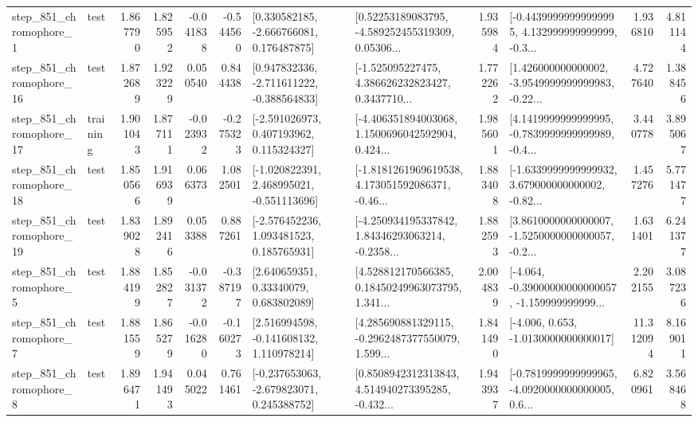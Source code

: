 \begin{tabular}{llrrrrllrlrr}
   step\_851\_chromophore\_1 &      test &      1.867790 &    1.825952 &     -0.041838 & -0.544560 &    [0.330582185, -2.666766081, 0.176487875] &  [0.52253189083795, -4.589252455319309, 0.05306... &       1.935984 &  [-0.44399999999999995, 4.132999999999999, -0.3... &            1.936810 &          4.811144 \\
  step\_851\_chromophore\_16 &      test &      1.872689 &    1.923229 &      0.050540 &  0.844438 &   [0.947832336, -2.711611222, -0.388564833] &  [-1.525095227475, 4.386626232823427, 0.3437710... &       1.772262 &  [1.426000000000002, -3.9549999999999983, -0.22... &            4.727640 &          1.388456 \\
  step\_851\_chromophore\_17 &  training &      1.901043 &    1.877111 &     -0.023932 & -0.275323 &    [-2.591026973, 0.407193962, 0.115324327] &  [-4.406351894003068, 1.1500696042592904, 0.424... &       1.985601 &  [4.1419999999999995, -0.7839999999999989, -0.4... &            3.440778 &          3.895067 \\
  step\_851\_chromophore\_18 &      test &      1.850566 &    1.916939 &      0.066373 &  1.082501 &   [-1.020822391, 2.468995021, -0.551113696] &  [-1.8181261969619538, 4.173051592086371, -0.46... &       1.883408 &  [-1.6339999999999932, 3.679000000000002, -0.82... &            1.457276 &          5.771477 \\
  step\_851\_chromophore\_19 &      test &      1.839028 &    1.892416 &      0.053388 &  0.887261 &    [-2.576452236, 1.093481523, 0.185765931] &  [-4.250934195337842, 1.84346293063214, -0.2358... &       1.882593 &  [3.8610000000000007, -1.5250000000000057, -0.2... &            1.631401 &          6.241377 \\
   step\_851\_chromophore\_5 &      test &      1.884199 &    1.852827 &     -0.031372 & -0.387197 &      [2.640659351, 0.33340079, 0.683802089] &  [4.528812170566385, 0.18450249963073795, 1.341... &       2.004839 &  [-4.064, -0.39000000000000057, -1.159999999999... &            2.202155 &          3.087236 \\
   step\_851\_chromophore\_7 &      test &      1.881559 &    1.865279 &     -0.016280 & -0.160273 &    [2.516994598, -0.141608132, 1.110978214] &  [4.285690881329115, -0.2962487377550079, 1.599... &       1.841490 &               [-4.006, 0.653, -1.0130000000000017] &           11.312094 &          8.169011 \\
   step\_851\_chromophore\_8 &      test &      1.896471 &    1.941493 &      0.045022 &  0.761461 &   [-0.237653063, -2.679823071, 0.245388752] &  [0.8508942312313843, 4.514940273395285, -0.432... &       1.943937 &  [-0.7819999999999965, -4.0920000000000005, 0.6... &            6.820961 &          3.568468 \\

\end{tabular}
